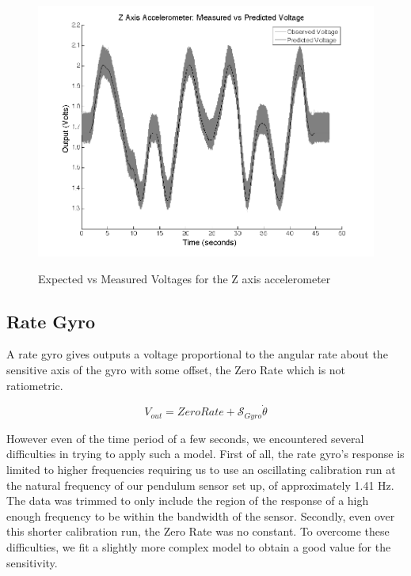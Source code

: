 \documentclass{article}
\theoremstyle{plain}
\theoremstyle{definition}
\theoremstyle{remark}
\newcommand{\Sens}{\mathcal{S}}
\begin{document}
\begin{figure}
\begin{center}
\includegraphics[width = 13cm]{ZaxisAccel_Calib.png}
\label{ZaccelCalib}
\caption{Expected vs Measured Voltages for the Z axis accelerometer}
\end{center}
\end{figure}

\subsection*{Rate Gyro}


A rate gyro gives outputs a voltage proportional to the angular rate about the sensitive axis of the gyro with some offset, the Zero Rate which is not ratiometric.  

$$V_{out} = ZeroRate + \Sens_{Gyro} \dot{\theta} $$

However even of the time period of a few seconds, we encountered several difficulties in trying to apply such a model.  First of all, the rate gyro's response is limited to higher frequencies requiring us to use an oscillating calibration run at the natural frequency of our pendulum sensor set up, of approximately 1.41 Hz.  The data was trimmed to only include the region of the response of a high enough frequency to be within the bandwidth of the sensor.  Secondly, even over this shorter calibration run, the Zero Rate was no constant.  To overcome these difficulties, we fit a slightly more complex model to obtain a good value for the sensitivity.
\end{document}
